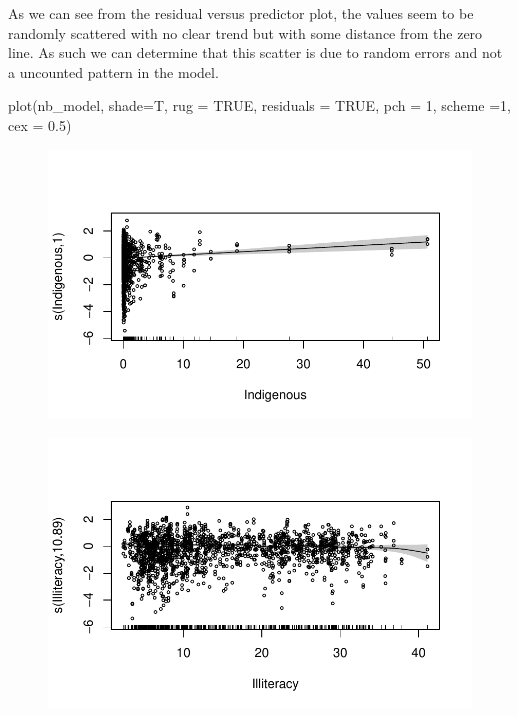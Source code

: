 \documentclass[
  letterpaper,
  DIV=11,
  numbers=noendperiod]{scrartcl}
\newenvironment{Shaded}{\begin{snugshade}}{\end{snugshade}}
\newcommand{\AttributeTok}[1]{\textcolor[rgb]{0.40,0.45,0.13}{#1}}
\newcommand{\ConstantTok}[1]{\textcolor[rgb]{0.56,0.35,0.01}{#1}}
\newcommand{\DecValTok}[1]{\textcolor[rgb]{0.68,0.00,0.00}{#1}}
\newcommand{\FloatTok}[1]{\textcolor[rgb]{0.68,0.00,0.00}{#1}}
\newcommand{\FunctionTok}[1]{\textcolor[rgb]{0.28,0.35,0.67}{#1}}
\newcommand{\NormalTok}[1]{\textcolor[rgb]{0.00,0.23,0.31}{#1}}
\begin{document}
As we can see from the residual versus predictor plot, the values seem
to be randomly scattered with no clear trend but with some distance from
the zero line. As such we can determine that this scatter is due to
random errors and not a uncounted pattern in the model.

\begin{Shaded}
\begin{Highlighting}[]
\FunctionTok{plot}\NormalTok{(nb\_model, }\AttributeTok{shade=}\NormalTok{T, }\AttributeTok{rug =} \ConstantTok{TRUE}\NormalTok{, }\AttributeTok{residuals =} \ConstantTok{TRUE}\NormalTok{,}
\AttributeTok{pch =} \DecValTok{1}\NormalTok{, }\AttributeTok{scheme =}\DecValTok{1}\NormalTok{,  }\AttributeTok{cex =} \FloatTok{0.5}\NormalTok{)}
\end{Highlighting}
\end{Shaded}

\begin{figure}[H]

{\centering \includegraphics{Group34Coursework_files/figure-pdf/unnamed-chunk-15-1.pdf}

}

\end{figure}

\begin{figure}[H]

{\centering \includegraphics{Group34Coursework_files/figure-pdf/unnamed-chunk-15-2.pdf}

}

\end{figure}
\end{document}
